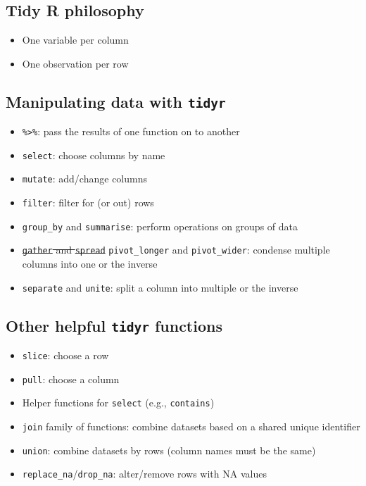 \documentclass[
]{book}
\providecommand{\tightlist}{%
  \setlength{\itemsep}{0pt}\setlength{\parskip}{0pt}}
\begin{document}
\hypertarget{tidy-r-philosophy}{%
\subsection{Tidy R philosophy}\label{tidy-r-philosophy}}

\begin{itemize}
\tightlist
\item
  One variable per column
\item
  One observation per row
\end{itemize}

\hypertarget{manipulating-data-with-tidyr}{%
\subsection{\texorpdfstring{Manipulating data with \texttt{tidyr}}{Manipulating data with tidyr}}\label{manipulating-data-with-tidyr}}

\begin{itemize}
\tightlist
\item
  \texttt{\%\textgreater{}\%}: pass the results of one function on to another
\item
  \texttt{select}: choose columns by name
\item
  \texttt{mutate}: add/change columns
\item
  \texttt{filter}: filter for (or out) rows
\item
  \texttt{group\_by} and \texttt{summarise}: perform operations on groups of data
\item
  \sout{\mbox{\texttt{gather}} and \mbox{\texttt{spread}}} \texttt{pivot\_longer} and \texttt{pivot\_wider}: condense multiple columns into one or the inverse
\item
  \texttt{separate} and \texttt{unite}: split a column into multiple or the inverse
\end{itemize}

\hypertarget{other-helpful-tidyr-functions}{%
\subsection{\texorpdfstring{Other helpful \texttt{tidyr} functions}{Other helpful tidyr functions}}\label{other-helpful-tidyr-functions}}

\begin{itemize}
\tightlist
\item
  \texttt{slice}: choose a row
\item
  \texttt{pull}: choose a column
\item
  Helper functions for \texttt{select} (e.g., \texttt{contains})
\item
  \texttt{join} family of functions: combine datasets based on a shared unique identifier
\item
  \texttt{union}: combine datasets by rows (column names must be the same)
\item
  \texttt{replace\_na}/\texttt{drop\_na}: alter/remove rows with NA values
\end{itemize}
\end{document}
